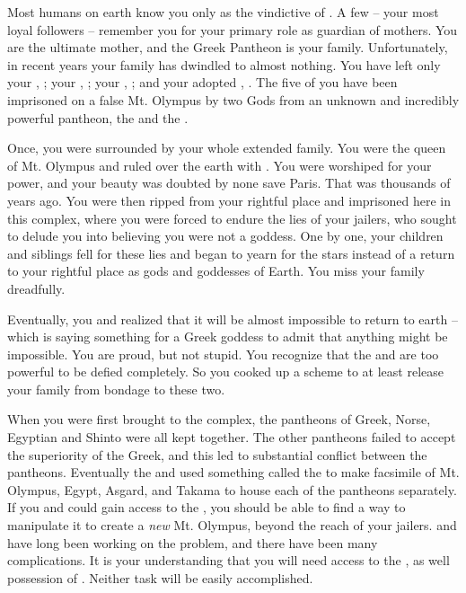 \documentclass[char]{guardians}
\begin{document}
\name{\cHera{}}

Most humans on earth know you only as the vindictive \cHera{\spouse} of \cZeus{}. A few -- your most loyal followers -- remember you for your primary role as guardian of mothers. You are the ultimate mother, and the Greek Pantheon is your family. Unfortunately, in recent years your family has dwindled to almost nothing. You have left only your \cZeus{\spouse}, \cZeus{}; your \cAthena{\offspring}, \cAthena{}; your \cHephaestus{\offspring}, \cHephaestus{}; and your adopted \cPandora{\offspring}, \cPandora{}. The five of you have been imprisoned on a false Mt. Olympus by two Gods from an unknown and incredibly powerful pantheon, the \cWarden{} and the \cCaretaker{}.

Once, you were surrounded by your whole extended family. You were the queen of Mt. Olympus and ruled over the earth with \cZeus{}. You were worshiped for your power, and your beauty was doubted by none save Paris. That was thousands of years ago. You were then ripped from your rightful place and imprisoned here in this complex, where you were forced to endure the lies of your jailers, who sought to delude you into believing you were not a goddess. One by one, your children and siblings fell for these lies and began to yearn for the stars instead of a return to your rightful place as gods and goddesses of Earth.  You miss your family dreadfully.

Eventually, you and \cZeus{} realized that it will be almost impossible to return to earth -- which is saying something for a Greek goddess to admit that anything might be impossible. You are proud, but not stupid. You recognize that the \cWarden{} and \cCaretaker{} are too powerful to be defied completely. So you cooked up a scheme to at least release your family from bondage to these two.

When you were first brought to the complex, the pantheons of Greek, Norse, Egyptian and Shinto were all kept together. The other pantheons failed to accept the superiority of the Greek, and this led to substantial conflict between the pantheons. Eventually the \cCaretaker{} and \cWarden{} used something called the \stone{} to make facsimile of Mt. Olympus, Egypt, Asgard, and Takama to house each of the pantheons separately. If you and \cZeus{} could gain access to the \stone{}, you should be able to find a way to manipulate it to create a \emph{new} Mt. Olympus, beyond the reach of your jailers.  \cZeus{} and \cHephaestus{} have long been working on the problem, and there have been many complications. It is your understanding that you will need access to the \stone{}, as well possession of \iHammer{\MYname}. Neither task will be easily accomplished.
\end{document}
